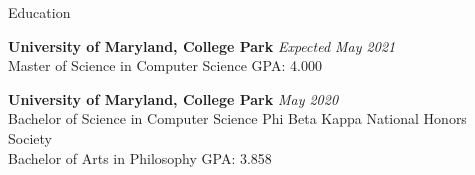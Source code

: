 \documentclass{resume} %
\begin{document}

\begin{rSection}{Education}

{\bf University of Maryland, College Park} \hfill {\em Expected May 2021} \\ 
Master of Science in  Computer Science \hfill {GPA: 4.000}

{\bf University of Maryland, College Park} \hfill {\em May 2020} \\ 
Bachelor of Science in  Computer Science \hfill {Phi Beta Kappa National Honors Society}\\
Bachelor of Arts in Philosophy \hfill {GPA: 3.858}

\end{rSection}

\end{document}
